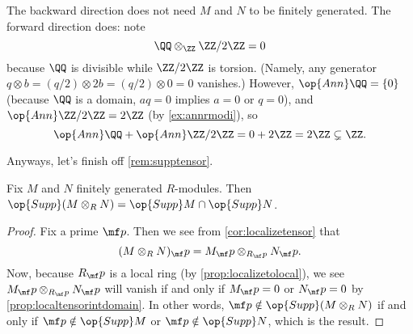 \begin{remark}[Nir]
	The backward direction does not need $M$ and $N$ to be finitely generated. The forward direction does: note
	\[\QQ\otimes_\ZZ\ZZ/2\ZZ=0\]
	because $\QQ$ is divisible while $\ZZ/2\ZZ$ is torsion. (Namely, any generator $q\otimes b=(q/2)\otimes2b=(q/2)\otimes0=0$ vanishes.) However, $\op{Ann}\QQ=\{0\}$ (because $\QQ$ is a domain, $aq=0$ implies $a=0$ or $q=0$), and $\op{Ann}\ZZ/2\ZZ=2\ZZ$ (by \autoref{ex:annrmodi}), so
	\[\op{Ann}\QQ+\op{Ann}\ZZ/2\ZZ=0+2\ZZ=2\ZZ\subsetneq\ZZ.\]
\end{remark}
Anyways, let's finish off \autoref{rem:supptensor}.
\begin{corollary} \label{cor:supptensor}
	Fix $M$ and $N$ finitely generated $R$-modules. Then $\op{Supp}(M\otimes_RN)=\op{Supp}M\cap\op{Supp}N$.
\end{corollary}
\begin{proof}
	Fix a prime $\mf p$. Then we see from \autoref{cor:localizetensor} that
	\[(M\otimes_RN)_\mf p=M_\mf p\otimes_{R_\mf p}N_\mf p.\]
	Now, because $R_\mf p$ is a local ring (by \autoref{prop:localizetolocal}), we see $M_\mf p\otimes_{R_\mf p}N_\mf p$ will vanish if and only if $M_\mf p=0$ or $N_\mf p=0$ by \autoref{prop:localtensorintdomain}. In other words, $\mf p\notin\op{Supp}(M\otimes_RN)$ if and only if $\mf p\notin\op{Supp}M$ or $\mf p\notin\op{Supp}N$, which is the result.
\end{proof}

